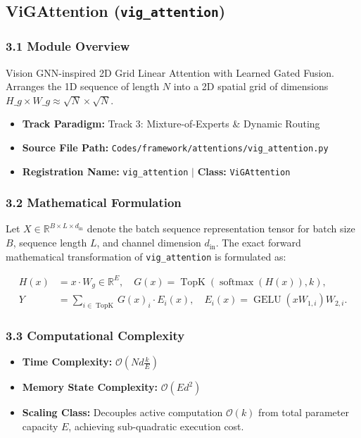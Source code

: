 \subsection{ViGAttention (\texttt{vig\_attention})}
\label{sec:app_module_vig_attention}

\subsubsection*{3.1 Module Overview}
Vision GNN-inspired 2D Grid Linear Attention with Learned Gated Fusion.  Arranges the 1D sequence of length $N$ into a 2D spatial grid of dimensions $H\_g \times W\_g \approx \sqrt{N} \times \sqrt{N}$.
\begin{itemize}
    \item \textbf{Track Paradigm:} Track 3: Mixture-of-Experts \& Dynamic Routing
    \item \textbf{Source File Path:} \texttt{Codes/framework/attentions/vig\_attention.py}
    \item \textbf{Registration Name:} \texttt{vig\_attention} $\mid$ \textbf{Class:} \texttt{ViGAttention}
\end{itemize}

\subsubsection*{3.2 Mathematical Formulation}
Let $X \in \mathbb{R}^{B \times L \times d_{\text{in}}}$ denote the batch sequence representation tensor for batch size $B$, sequence length $L$, and channel dimension $d_{\text{in}}$. The exact forward mathematical transformation of \texttt{vig\_attention} is formulated as:

\begin{align}
H(x) &= x \cdot W_g \in \mathbb{R}^{E}, \quad G(x) = \operatorname{TopK}\left(\operatorname{softmax}(H(x)), k\right), \\
Y &= \sum_{i \in \operatorname{TopK}} G(x)_i \cdot E_i(x), \quad E_i(x) = \operatorname{GELU}(x W_{1, i}) W_{2, i}.
\end{align}


\subsubsection*{3.3 Computational Complexity}
\begin{itemize}
    \item \textbf{Time Complexity:} $\mathcal{O}(N d \frac{k}{E})$
    \item \textbf{Memory State Complexity:} $\mathcal{O}(E d^2)$
    \item \textbf{Scaling Class:} Decouples active computation $\mathcal{O}(k)$ from total parameter capacity $E$, achieving sub-quadratic execution cost.
\end{itemize}

